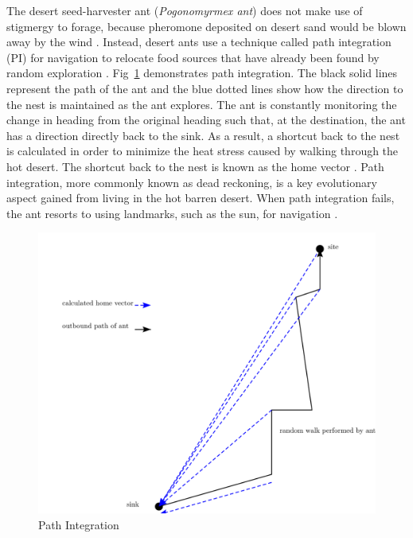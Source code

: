The desert seed-harvester ant (\textit{Pogonomyrmex ant}) does not make use of stigmergy to forage, because pheromone deposited on desert sand would be blown away by the wind \cite{collett1992visual,hecker2015beyond}. Instead, desert ants use a technique called path integration (PI) for navigation to relocate food sources that have already been found by random exploration \cite{collett1998local,wehner2003desert}. Fig~\ref{pathintegration} demonstrates path integration. The black solid lines represent the path of the ant and the blue dotted lines show how the direction to the nest is maintained as the ant explores. The ant is constantly monitoring the change in heading from the original heading such that, at the destination, the ant has a direction directly back to the sink. As a result, a shortcut back to the nest is calculated in order to minimize the heat stress caused by walking through the hot desert. The shortcut back to the nest is known as the home vector \cite{muller1988path}. Path integration, more commonly known as dead reckoning, is a key evolutionary aspect gained from living in the hot barren desert. When path integration fails, the ant resorts to using landmarks, such as the sun, for navigation \cite{collett1998local}.

\begin{figure} [h]
	\centering
	\includegraphics[width=\textwidth]{chapters/chapter2/figures/drawing.png}
	\caption{Path Integration}
	\label{pathintegration}
\end{figure}

